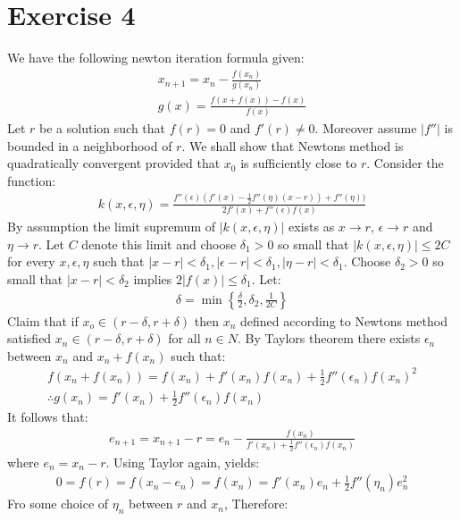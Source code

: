 \section{Exercise 4}
We have the following newton iteration formula given:
\begin{gather*}
x_{n+1} = x_n - \frac{f(x_n)}{g(x_n)}\\
g(x) = \frac{f(x+f(x)) - f(x)}{f(x)}
\end{gather*}
Let $r$ be a solution such that $f(r)=0$ and $f'(r) \neq 0$. Moreover assume $|f''|$ is bounded in a neighborhood of $r$. We shall show that Newtons method is quadratically convergent provided that $x_0$ is sufficiently close to $r$.
Consider the function:
\begin{gather*}
k(x,\epsilon,\eta) = \frac{f''(\epsilon)(f'(x)  -\frac{1}{2} f''(\eta)(x-r)) + f''(\eta) )}{2 f'(x) + f''(\epsilon)f(x)}
\end{gather*}
By assumption the limit supremum of $|k(x,\epsilon,\eta)|$ exists as $x \to r$, $\epsilon \to r$ and $\eta \to r$. Let $C$ denote this limit and choose $\delta_1 > 0$ so small that $|k(x,\epsilon,\eta)|\leq 2C$ for every $x,\epsilon,\eta$ such that $|x-r| < \delta_1, |\epsilon -r | < \delta_1 , |\eta-r| < \delta_1$. Choose $\delta_2 > 0$ so small that $|x-r| < \delta_2 $ implies $2|f(x)| \leq \delta_1$.
Let:
\begin{gather*}
\delta = \min \left\lbrace \frac{\delta}{2},\delta_2 , \frac{1}{2C}\right\rbrace
\end{gather*}
Claim that if $x_o \in (r-\delta,r+\delta)$ then $x_n$ defined according to Newtons method satisfied $x_n \in ( r- \delta ,r+\delta)$ for all $n \in N$.
By Taylors theorem there exists $\epsilon_n$ between $x_n$ and $x_n + f(x_n)$ such that:
\begin{gather*}
f(x_n + f(x_n)) = f(x_n) + f'(x_n)f(x_n) + \frac{1}{2} f''(\epsilon_n)f(x_n)^2\\
\therefore g(x_n) = f'(x_n) + \frac{1}{2} f''(\epsilon_n)f(x_n)
\end{gather*}
It follows that:
\begin{gather*}
e_{n+1} = x_{n+1} -r = e_{n} - \frac{f(x_n)}{f'(x_n) + \frac{1}{2} f''(\epsilon_n)f(x_n)}
\end{gather*}
where $e_n = x_n -r$.
Using Taylor again, yields:
\begin{gather*}
0 = f(r) = f(x_n -e_n) = f(x_n) = f'(x_n)e_n + \frac{1}{2} f''(\eta_n)e_n^2
\end{gather*}
Fro some choice of $\eta_n$ between $r$ and $x_n$, Therefore:
